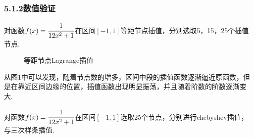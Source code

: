 \documentclass[12pt]{article}
\begin{document}
\subsubsection*{{\small 5.1.2}\quad\small\heiti 数值验证} 
\par 对函数$f(x)=\cfrac{1}{12x^{2}+1}$在区间$[-1,1]$等距节点插值，分别选取5，15，25个插值节点.

\begin{figure}[h]
	\label{fig0003} 
	\caption{等距节点Lagrange插值}
\end{figure}

\par 从图1中可以发现，随着节点数的增多，区间中段的插值函数逐渐逼近原函数，但是在靠近区间边缘的位置，插值函数出现明显振荡，并且随着阶数的阶数逐渐变大.
\par 对函数$f(x)=\cfrac{1}{12x^{2}+1}$在区间$[-1,1]$选取25个节点，分别进行chebyshev插值，与三次样条插值.
\end{document}
